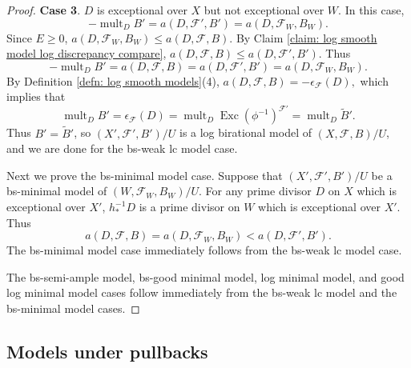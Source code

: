 \documentclass[11pt]{amsart}
\numberwithin{equation}{section}
\newcommand{\Exc}{\operatorname{Exc}}
\newcommand{\mult}{\operatorname{mult}}
\newcommand{\Ff}{\mathcal{F}}
\theoremstyle{definition}
\theoremstyle{definition}
\theoremstyle{definition}
\begin{document}
\begin{proof}
\medskip

\noindent\textbf{Case 3}. $D$ is exceptional over $X$ but not exceptional over $W$. In this case,
$$-\mult_DB'=a(D,\Ff',B')=a(D,\Ff_W,B_W).$$
Since $E\geq 0$,
$a(D,\Ff_W,B_W)\leq a(D,\Ff,B).$
By Claim \ref{claim: log smooth model log discrepancy compare}, 
$a(D,\Ff,B)\leq a(D,\Ff',B').$
Thus
$$-\mult_DB'=a(D,\Ff,B)=a(D,\Ff',B')=a(D,\Ff_W,B_W).$$
By Definition \ref{defn: log smooth models}(4), $a(D,\Ff,B)=-\epsilon_{\Ff}(D),$
which implies that
$$\mult_DB'=\epsilon_{\Ff}(D)=\mult_D\Exc(\phi^{-1})^{\Ff'}=\mult_D\tilde B'.$$
Thus $B'=\tilde B'$, so $(X',\Ff',B')/U$ is a log birational model of $(X,\Ff,B)/U$, and we are done for the bs-weak lc model case.

Next we prove the bs-minimal model case. Suppose that $(X',\Ff',B')/U$ be a bs-minimal model of $(W,\Ff_W,B_W)/U$. For any prime divisor $D$ on $X$ which is exceptional over $X'$, $h^{-1}_*D$ is a prime divisor on $W$ which is exceptional over $X'$. Thus
$$a(D,\Ff,B)=a(D,\Ff_W,B_W)<a(D,\Ff',B').$$
The bs-minimal model case immediately follows from the bs-weak lc model case. 

The  bs-semi-ample model, bs-good minimal model, log minimal model, and good log minimal model cases follow immediately from the bs-weak lc model and the bs-minimal model cases.
\end{proof}



\subsection{Models under pullbacks}
\end{document}
